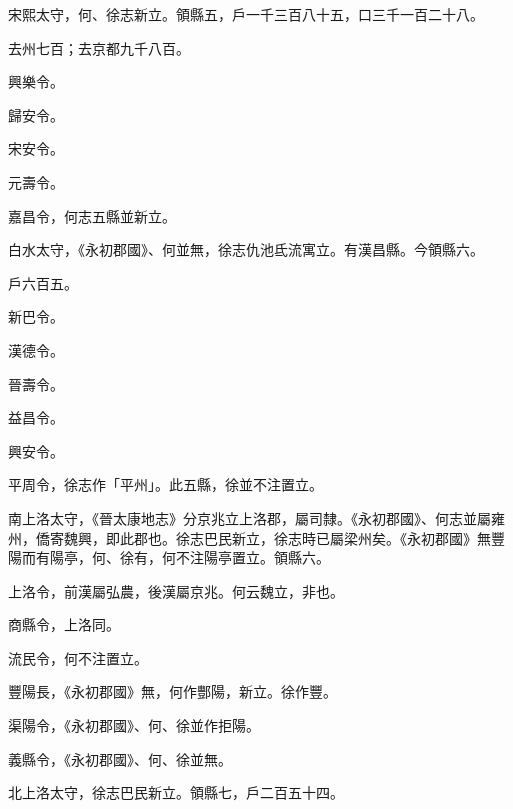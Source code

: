 \begin{pinyinscope}
 宋熙太守，何、徐志新立。領縣五，戶一千三百八十五，口三千一百二十八。



 去州七百；去京都九千八百。



 興樂令。



 歸安令。



 宋安令。



 元壽令。



 嘉昌令，何志五縣並新立。



 白水太守，《永初郡國》、何並無，徐志仇池氐流寓立。有漢昌縣。今領縣六。



 戶六百五。



 新巴令。



 漢德令。



 晉壽令。



 益昌令。



 興安令。



 平周令，徐志作「平州」。此五縣，徐並不注置立。



 南上洛太守，《晉太康地志》分京兆立上洛郡，屬司隸。《永初郡國》、何志並屬雍州，僑寄魏興，即此郡也。徐志巴民新立，徐志時已屬梁州矣。《永初郡國》無豐陽而有陽亭，何、徐有，何不注陽亭置立。領縣六。



 上洛令，前漢屬弘農，後漢屬京兆。何云魏立，非也。



 商縣令，上洛同。



 流民令，何不注置立。



 豐陽長，《永初郡國》無，何作酆陽，新立。徐作豐。



 渠陽令，《永初郡國》、何、徐並作拒陽。



 義縣令，《永初郡國》、何、徐並無。



 北上洛太守，徐志巴民新立。領縣七，戶二百五十四。




\end{pinyinscope}
